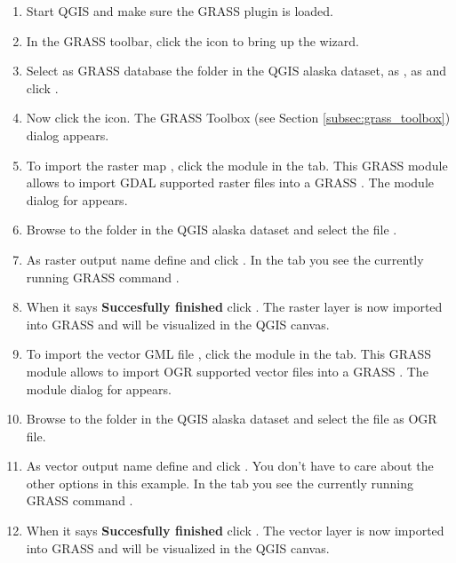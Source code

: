 \begin{enumerate}
  \item Start QGIS and make sure the GRASS plugin is loaded.
  \item In the GRASS toolbar, click the  icon to bring up the  wizard.
  \item Select as GRASS database the folder  in the QGIS
  alaska dataset, as , as 
   and click .
  \item Now click the  icon. The
  GRASS Toolbox (see Section \ref{subsec:grass_toolbox}) dialog appears.
  \item To import the raster map , click the module
   in the  tab. This GRASS module
  allows to import GDAL supported raster files into a GRASS
  . The module dialog for  appears.
  \item Browse to the folder  in the QGIS alaska dataset
  and select the file .
  \item As raster output name define  and click
  . In the  tab you see the currently running GRASS
  command .
  \item When it says \textbf{Succesfully finished} click .
  The  raster layer is now imported into GRASS and
  will be visualized in the QGIS canvas.
  \item To import the vector GML file , click the module
   in the  tab. This GRASS module allows
  to import OGR supported vector files into a GRASS . The
  module dialog for  appears.
  \item Browse to the folder  in the QGIS alaska
  dataset and select the file  as OGR file.
  \item As vector output name define  and click
  . You don't have to care about the other options in this
  example. In the  tab you see the currently running GRASS
  command .
  \item When it says \textbf{Succesfully finished} click .
  The  vector layer is now imported into GRASS and will
  be visualized in the QGIS canvas.
\end{enumerate}


